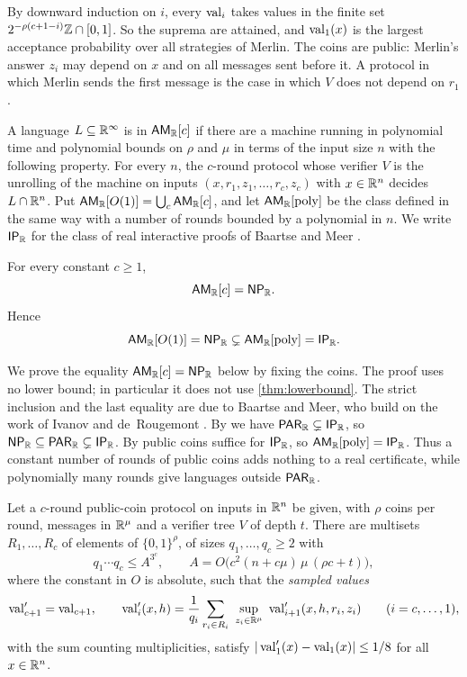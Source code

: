 By downward induction on $i$, every $\operatorname{val}_i$ takes values in the finite set $2^{-\rho(c+1-i)}\mathbb{Z}\cap[0,1]$.
So the suprema are attained, and $\operatorname{val}_1(x)$ is the largest acceptance probability over all strategies of Merlin.
The coins are public: Merlin's answer $z_i$ may depend on $x$ and on all messages sent before it.
A protocol in which Merlin sends the first message is the case in which $V$ does not depend on $r_1$.

A language $L\subseteq\mathbb{R}^\infty$ is in $\textsf{\upshape AM}_{\mathbb{R}}[c]$ if there are a machine running in polynomial time and polynomial bounds on $\rho$ and $\mu$ in terms of the input size $n$ with the following property.
For every $n$, the $c$-round protocol whose verifier $V$ is the unrolling of the machine on inputs $(x,r_1,z_1,\dots,r_c,z_c)$ with $x\in\mathbb{R}^n$ decides $L\cap\mathbb{R}^n$.
Put $\textsf{\upshape AM}_{\mathbb{R}}[O(1)]=\bigcup_c\textsf{\upshape AM}_{\mathbb{R}}[c]$, and let $\textsf{\upshape AM}_{\mathbb{R}}[\mathrm{poly}]$ be the class defined in the same way with a number of rounds bounded by a polynomial in $n$.
We write $\textsf{\upshape IP}_{\mathbb{R}}$ for the class of real interactive proofs of Baartse and Meer \cite{BM16}.

\begin{theorem}\label{thm:am}
For every constant $c\ge1$,
\[
\textsf{\upshape AM}_{\mathbb{R}}[c]=\textsf{\upshape NP}_{\mathbb{R}} .
\]
Hence
\[
\textsf{\upshape AM}_{\mathbb{R}}[O(1)]=\textsf{\upshape NP}_{\mathbb{R}}\subsetneq\textsf{\upshape AM}_{\mathbb{R}}[\mathrm{poly}]=\textsf{\upshape IP}_{\mathbb{R}} .
\]
\end{theorem}

We prove the equality $\textsf{\upshape AM}_{\mathbb{R}}[c]=\textsf{\upshape NP}_{\mathbb{R}}$ below by fixing the coins.
The proof uses no lower bound; in particular it does not use \cref{thm:lowerbound}.
The strict inclusion and the last equality are due to Baartse and Meer, who build on the work of Ivanov and de~Rougemont \cite{IdR99}.
By \cite[Theorem~14]{BM16} we have $\textsf{\upshape PAR}_{\mathbb{R}}\subsetneq\textsf{\upshape IP}_{\mathbb{R}}$, so $\textsf{\upshape NP}_{\mathbb{R}}\subseteq\textsf{\upshape PAR}_{\mathbb{R}}\subsetneq\textsf{\upshape IP}_{\mathbb{R}}$.
By \cite[Proposition~6]{BM16} public coins suffice for $\textsf{\upshape IP}_{\mathbb{R}}$, so $\textsf{\upshape AM}_{\mathbb{R}}[\mathrm{poly}]=\textsf{\upshape IP}_{\mathbb{R}}$.
Thus a constant number of rounds of public coins adds nothing to a real certificate, while polynomially many rounds give languages outside $\textsf{\upshape PAR}_{\mathbb{R}}$.

\begin{lemma}\label{lem:coins}
Let a $c$-round public-coin protocol on inputs in $\mathbb{R}^n$ be given, with $\rho$ coins per round, messages in $\mathbb{R}^\mu$ and a verifier tree $V$ of depth $t$.
There are multisets $R_1,\dots,R_c$ of elements of $\{0,1\}^\rho$, of sizes $q_1,\dots,q_c\ge2$ with
\[
q_1\cdots q_c\le A^{3^c},\qquad A=O\bigl(c^2(n+c\mu)\,\mu\,(\rho c+t)\bigr),
\]
where the constant in $O$ is absolute, such that the \emph{sampled values}
\begin{equation}\label{eq:amsampled}
\val'_{c+1}=\val_{c+1},\qquad
\val'_i(x,h)=\frac1{q_i}\sum_{r_i\in R_i}\ \sup_{z_i\in\RR^\mu}\ \val'_{i+1}(x,h,r_i,z_i)\qquad(i=c,\dots,1),
\end{equation}
with the sum counting multiplicities, satisfy $|\operatorname{val}'_1(x)-\operatorname{val}_1(x)|\le1/8$ for all $x\in\mathbb{R}^n$.
\end{lemma}


